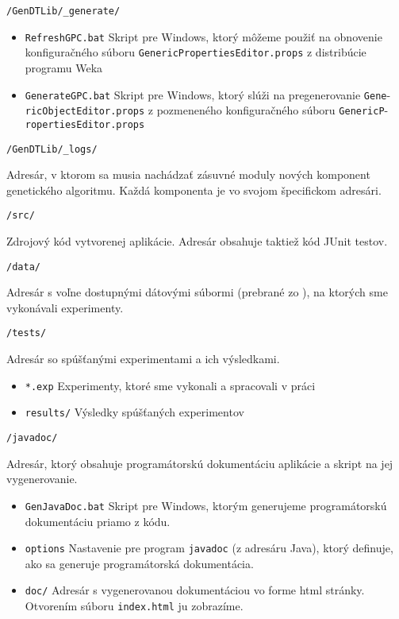{\LARGE\verb|/GenDTLib/_generate/|}

{
\begin{itemize}
\item \verb|RefreshGPC.bat| Skript pre Windows, ktorý môžeme použiť na obnovenie konfiguračného súboru \verb|GenericPropertiesEditor.props| z distribúcie programu Weka
\item \verb|GenerateGPC.bat| Skript pre Windows, ktorý slúži na pregenerovanie \verb|Gene|- \verb|ricObjectEditor.props| z pozmeneného konfiguračného súboru \verb|GenericP|- \verb|ropertiesEditor.props|
\end{itemize}
}

{\LARGE\verb|/GenDTLib/_logs/|}

{
Adresár, v ktorom sa musia nachádzať zásuvné moduly nových komponent genetického algoritmu. Každá komponenta je vo svojom špecifickom adresári.
}

{\LARGE\verb|/src/|}

{
Zdrojový kód vytvorenej aplikácie. Adresár obsahuje taktiež kód JUnit testov.
}

{\LARGE\verb|/data/|} 

{
Adresár s voľne dostupnými dátovými súbormi (prebrané zo \cite{online-uci}), na ktorých sme vykonávali experimenty.
}

{\LARGE\verb|/tests/|}

{
Adresár so spúšťanými experimentami a ich výsledkami.
\begin{itemize}
\item \verb|*.exp| Experimenty, ktoré sme vykonali a spracovali v práci
\item \verb|results/| Výsledky spúšťaných experimentov
\end{itemize}
}

{\LARGE\verb|/javadoc/|}

Adresár, ktorý obsahuje programátorskú dokumentáciu aplikácie a skript na jej vygenerovanie. 
{
\begin{itemize}
\item \verb|GenJavaDoc.bat| Skript pre Windows, ktorým generujeme programátorskú dokumentáciu priamo z kódu.
\item \verb|options| Nastavenie pre program \verb|javadoc| (z adresáru Java), ktorý definuje, ako sa generuje programátorská dokumentácia.
\item \verb|doc/| Adresár s vygenerovanou dokumentáciou vo forme html stránky. Otvorením súboru \verb|index.html| ju zobrazíme.
\end{itemize}
}


